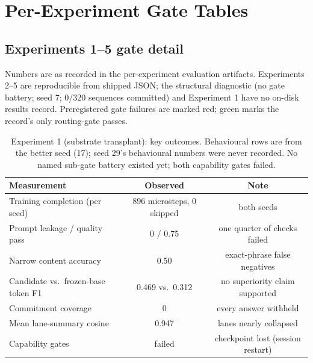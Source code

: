 \documentclass[10pt,a4paper]{article}
\newcommand{\fail}[1]{\textcolor{failred}{#1}}
\newcommand{\good}[1]{\textcolor{okgreen}{#1}}
\begin{document}
\clearpage
\appendix

\section{Per-Experiment Gate Tables}\label{app:gates}

\subsection*{Experiments 1--5 gate detail}

Numbers are as recorded in the per-experiment evaluation artifacts. Experiments 2--5 are reproducible from shipped JSON; the structural diagnostic (no gate battery; seed 7; 0/320 sequences committed) and Experiment 1 have no on-disk results record. Preregistered gate failures are marked \fail{red}; \good{green} marks the record's only routing-gate passes.

\begin{table}[htbp]
\caption{Experiment 1 (substrate transplant): key outcomes. Behavioural rows are from the better seed (17); seed 29's behavioural numbers were never recorded. No named sub-gate battery existed yet; both capability gates failed.}
\label{tab:gates-exp1}
\centering\footnotesize
\begin{tabularx}{\textwidth}{@{}Xcc@{}}
\toprule
Measurement & Observed & Note \\
\midrule
Training completion (per seed) & 896 microsteps, 0 skipped & both seeds \\
Prompt leakage / quality pass & 0 / 0.75 & one quarter of checks failed \\
Narrow content accuracy & 0.50 & exact-phrase false negatives \\
Candidate vs.\ frozen-base token F1 & 0.469 vs.\ 0.312 & no superiority claim supported \\
Commitment coverage & 0 & every answer withheld \\
Mean lane-summary cosine & 0.947 & lanes nearly collapsed \\
Capability gates & \fail{failed} & checkpoint lost (session restart) \\
\bottomrule
\end{tabularx}
\end{table}
\end{document}
